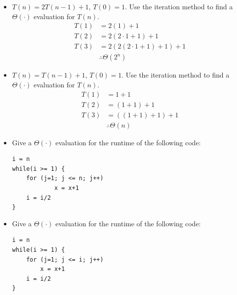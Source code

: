 \documentclass[11pt]{article}
\begin{document}
\begin{itemize}
	\item $T(n) = 2T(n-1) + 1$, $T(0)=1$.  Use the iteration method to find a $\Theta(\cdot)$ evaluation for $T(n)$.
	      \begin{align*}
		      T(1) & = 2(1) + 1                   \\
		      T(2) & = 2(2\cdot 1 + 1) + 1        \\
		      T(3) & = 2(2(2\cdot 1 + 1) + 1) + 1 \\
		           & \therefore \Theta{(2^{n})}
	      \end{align*}
	\item $T(n) = T(n-1) + 1$,  $T(0)=1$.  Use the iteration method to find a $\Theta(\cdot)$ evaluation for $T(n)$.
	      \begin{align*}
		      T(1) & = 1 + 1                \\
		      T(2) & = (1+1) + 1            \\
		      T(3) & = ((1+1)+1) + 1        \\
		           & \therefore \Theta{(n)}
	      \end{align*}
	\item Give a $\Theta(\cdot)$ evaluation for the runtime of the following code:

	      \begin{lstlisting}[numbers=none, keywordstyle=\bfseries, frame=none, title=\(\Theta{(n \log{n})}\)]
i = n
while(i >= 1) {
	for (j=1; j <= n; j++)
			x = x+1
	i = i/2
}
	\end{lstlisting}

	\item Give a $\Theta( \cdot)$ evaluation for the runtime of the following code:
	      \begin{lstlisting}[numbers=none, keywordstyle=\bfseries, frame=none, title={\(\Theta{(n \log{n})}\)}]
i = n
while(i >= 1) {
	for (j=1; j <= i; j++)
		x = x+1
	i = i/2
}
	\end{lstlisting}
\end{itemize} \par
\newpage
\end{document}

